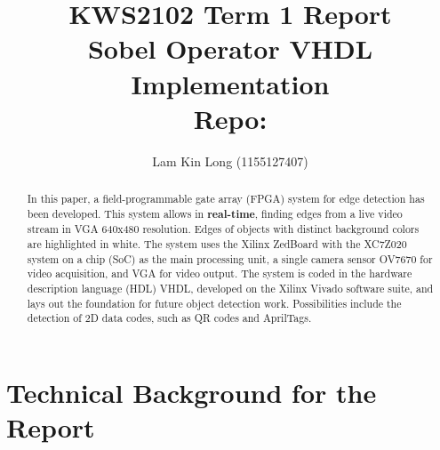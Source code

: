 \documentclass{article}
\title{KWS2102 Term 1 Report\\Sobel Operator VHDL Implementation\\Repo: \aaa{https://github.com/slypiggies/fyp}{\faGithub}}
\author{Lam Kin Long (1155127407)}
\date{}
\begin{document}
	\renewcommand{\baselinestretch}{2}\normalsize
\begin{titlepage}
\maketitle\thispagestyle{empty}
\end{titlepage}
	\begin{abstract}
		In this paper, a field-programmable gate array (FPGA) system for edge detection has been developed. This system allows in \textbf{real-time}, finding edges from a live video stream in VGA 640x480 resolution. Edges of objects with distinct background colors are highlighted in white. The system uses the Xilinx ZedBoard with the XC7Z020 system on a chip (SoC) as the main processing unit, a single camera sensor OV7670 for video acquisition, and VGA \cite{vga} for video output. The system is coded in the hardware description language (HDL) VHDL, developed on the Xilinx Vivado software suite, and lays out the foundation for future object detection work. Possibilities include the detection of 2D data codes, such as QR codes and AprilTags.
	\end{abstract}\newpage
	
	\renewcommand{\baselinestretch}{1.88}\normalsize
	\tableofcontents
	\renewcommand{\baselinestretch}{2.35}\normalsize
	
	
	\newpage\section{Technical Background for the Report}
\end{document}
